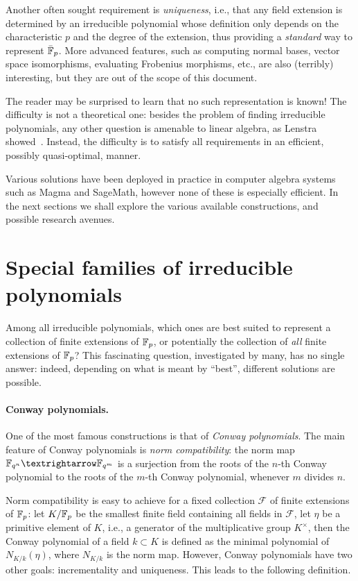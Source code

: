 \documentclass{report}
\theoremstyle{plain}
\theoremstyle{definition}
\begin{document}
Another often sought requirement is \emph{uniqueness}, i.e., that any
field extension is determined by an irreducible polynomial whose
definition only depends on the characteristic $p$ and the degree of
the extension, thus providing a \emph{standard} way to represent
$\bar{\mathbb{F}}_p$. %
More advanced features, such as computing normal bases, vector space
isomorphisms, evaluating Frobenius morphisms, etc., are also
(terribly) interesting, but they are out of the scope of this
document. %

The reader may be surprised to learn that no such representation is
known! %
The difficulty is not a theoretical one: besides the problem of
finding irreducible polynomials, any other question is amenable to
linear algebra, as Lenstra showed~\cite{LenstraJr91}. %
Instead, the difficulty is to satisfy all requirements in an
efficient, possibly quasi-optimal, manner. %

Various solutions have been deployed in practice in computer algebra
systems such as Magma and SageMath, however none of these is
especially efficient. %
In the next sections we shall explore the various available
constructions, and possible research avenues. %


\section{Special families of irreducible polynomials}
\label{sec:spec-famil-irred}

Among all irreducible polynomials, which ones are best suited to
represent a collection of finite extensions of $\mathbb{F}_p$, or potentially
the collection of \emph{all} finite extensions of $\mathbb{F}_p$? %
This fascinating question, investigated by many, has no single answer:
indeed, depending on what is meant by ``best'', different solutions
are possible. %

\paragraph{Conway polynomials.}
One of the most famous constructions is that of \emph{Conway
  polynomials}. %
The main feature of Conway polynomials is \emph{norm compatibility}:
the norm map $\F_{q^n}→\F_{q^m}$ is a surjection from the roots of the
$n$-th Conway polynomial to the roots of the $m$-th Conway polynomial,
whenever $m$ divides $n$. %

Norm compatibility is easy to achieve for a fixed collection
$\mathcal{F}$ of finite extensions of $\mathbb{F}_p$: let $K/\mathbb{F}_p$ be the
smallest finite field containing all fields in $\mathcal{F}$, let $η$
be a primitive element of $K$, i.e., a generator of the multiplicative
group $K^×$, then the Conway polynomial of a field $k⊂K$ is defined as
the minimal polynomial of $N_{K/k}(η)$, where $N_{K/k}$ is the norm
map. %
However, Conway polynomials have two other goals: incrementality and
uniqueness. %
This leads to the following definition.
\end{document}
